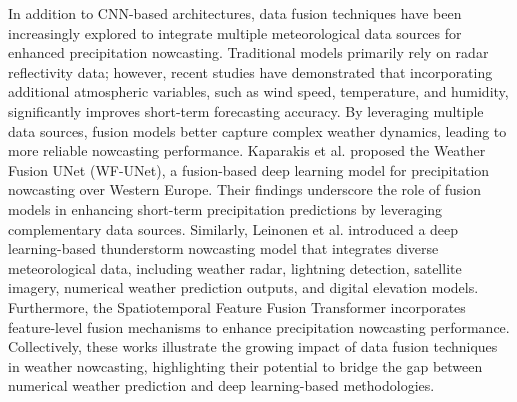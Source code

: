 In addition to CNN-based architectures, data fusion techniques have been increasingly explored to integrate multiple meteorological data sources for enhanced precipitation nowcasting. Traditional models primarily rely on radar reflectivity data; however, recent studies have demonstrated that incorporating additional atmospheric variables, such as wind speed, temperature, and humidity, significantly improves short-term forecasting accuracy. By leveraging multiple data sources, fusion models better capture complex weather dynamics, leading to more reliable nowcasting performance. Kaparakis et al. \cite{kaparakis2023wf} proposed the Weather Fusion UNet (WF-UNet), a fusion-based deep learning model for precipitation nowcasting over Western Europe. Their findings underscore the role of fusion models in enhancing short-term precipitation predictions by leveraging complementary data sources. Similarly, Leinonen et al. \cite{leinonen2023thunderstorm} introduced a deep learning-based thunderstorm nowcasting model that integrates diverse meteorological data, including weather radar, lightning detection, satellite imagery, numerical weather prediction outputs, and digital elevation models. Furthermore, the Spatiotemporal Feature Fusion Transformer \cite{xiong2024spatiotemporal} incorporates feature-level fusion mechanisms to enhance precipitation nowcasting performance. Collectively, these works illustrate the growing impact of data fusion techniques in weather nowcasting, highlighting their potential to bridge the gap between numerical weather prediction and deep learning-based methodologies.